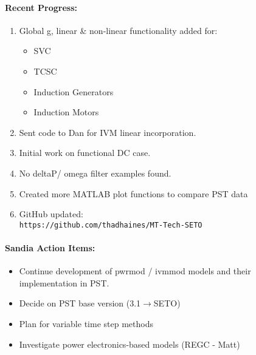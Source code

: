 \documentclass[12pt]{article}
\begin{document}
\begin{multicols}{2}
\raggedright

\paragraph{Recent Progress:}
	\begin{enumerate}
		\itemsep0em 
		\item Global g, linear \& non-linear functionality added for:
		\begin{minipage}{\linewidth}
				\begin{itemize}
		\itemsep0em 
				\footnotesize
					\item SVC
					\item TCSC
					\item Induction Generators
					\item Induction Motors
				\end{itemize}
		\end{minipage}
		\item Sent code to Dan for IVM linear incorporation.
		\item Initial work on functional DC case.
		\item No deltaP/ omega filter examples found.
		
		\item Created more MATLAB plot functions to compare PST data
		\item GitHub updated:\\
	{\footnotesize	\verb|https://github.com/thadhaines/MT-Tech-SETO| }\\
	\end{enumerate}
	

\paragraph{Sandia Action Items:}
	\begin{itemize}
		\itemsep 0em 
			\item Continue development of pwrmod / ivmmod models and their implementation in PST.
			\item Decide on PST base version (3.1$\longrightarrow$SETO)
			\item Plan for variable time step methods
			\item Investigate power electronics-based models (REGC - Matt)
	\end{itemize}
	

\end{multicols}
\end{document}

